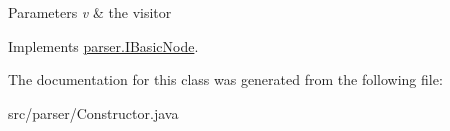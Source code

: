 \begin{DoxyParams}{Parameters}
{\em v} & the visitor \\
\hline
\end{DoxyParams}


Implements \hyperlink{interfaceparser_1_1_i_basic_node_af8790b7076c59e00781ba3d4118757cd}{parser.\+I\+Basic\+Node}.



The documentation for this class was generated from the following file\+:\begin{DoxyCompactItemize}
\item 
src/parser/Constructor.\+java\end{DoxyCompactItemize}
